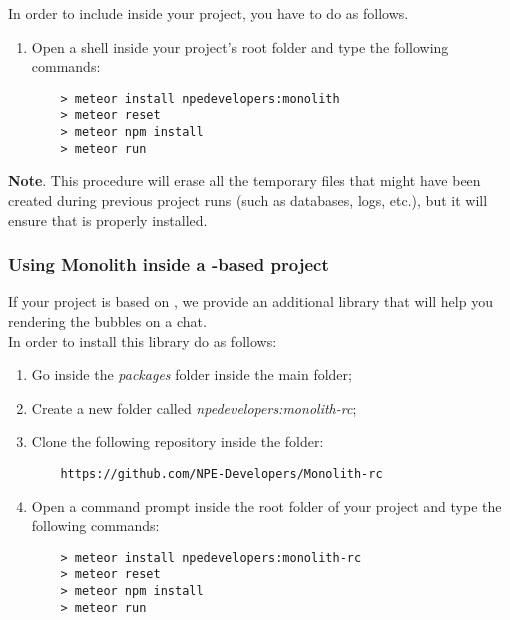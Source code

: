 In order to include  inside your  project, you have to do as follows.
\begin{enumerate}

	\item Open a shell inside your project's root folder and type the following commands:
	\begin{lstlisting}
    > meteor install npedevelopers:monolith
    > meteor reset
    > meteor npm install
    > meteor run
	\end{lstlisting}
\end{enumerate}	

\textbf{Note}. This procedure will erase all the temporary files that might have been created during previous project runs (such as databases, logs, etc.), but it will ensure that  is properly installed.
	
\subsubsection{Using Monolith inside a -based project}
If your project is based on , we provide an additional library that will help you rendering the bubbles on a  chat. \\
In order to install this library do as follows:
\begin{enumerate}

	\item Go inside the \textit{packages} folder inside the main  folder;
	\item Create a new folder called \textit{npedevelopers:monolith-rc};
	\item Clone the following repository inside the folder:
	\begin{lstlisting}
    https://github.com/NPE-Developers/Monolith-rc
	\end{lstlisting}
	\item Open a command prompt inside the root folder of your project and type the following commands:
	\begin{lstlisting}
    > meteor install npedevelopers:monolith-rc
    > meteor reset
    > meteor npm install
    > meteor run
	\end{lstlisting}

\end{enumerate}


